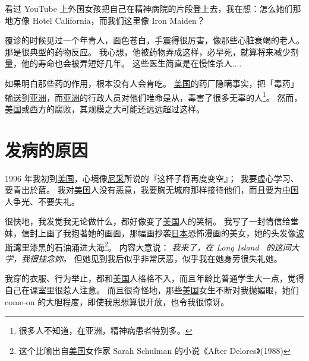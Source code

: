 \documentclass[12pt]{report}
\newcommand{\cc}[2]{#1}
\newcommand{\cc}[2]{#2}
\newcommand{\speechCn}[1]{\textrm{\textit{\textcolor{Speech}{#1}}}}
\begin{document}
{{}

\cc{
看过 YouTube 上外国女孩把自己在精神病院的片段登上去，我在想：怎么她们那地方像 Hotel California，而我们这里像 Iron Maiden？
}{
	
}

\cc{
覆诊的时候见过一个年青人，面色苍白，手震得很厉害，像那些心脏衰竭的老人。 那是很典型的药物反应。 我心想，他被药物弄成这样，必早死，就算将来减少剂量，他的寿命也会被弄短好几年。 这些医生简直是在慢性杀人....
}{
	
}

\cc{
如果明白那些药的作用，根本没有人会肯吃。 \uline{美国}的药厂隐瞒事实，把「毒药」输送到\uline{亚洲}，而\uline{亚洲}的行政人员对他们唯命是从，毒害了很多无辜的人\footnote{很多人不知道，在亚洲，精神病患者特别多。}。 然而，\uline{美国}或西方的腐败，其规模之大可能还远远超过这样。
}{
	
}


\chapter{\cc{发病的原因}{Cause of illness}}
\label{cause-of-illness}

\cc{
1996 年我初到\uline{美国}，心境像\uline{尼采}所说的『这杯子将再度变空』；\ 我要虚心学习、要青出於蓝。 我对\uline{美国}人没有恶意，我要胸无城府那样接待他们，而且要为\uline{中国}人争光、不要失礼。
}{
	
}

\cc{
很快地，我发觉我无论做什么，都好像变了\uline{美国}人的笑柄。 我写了一封情信给堂妹，信封上画了我抱著她的画面，那幅画抄袭\uline{日本}恐怖漫画的美女，她的头发像\uline{波斯湾}里漆黑的石油涌进大海\footnote{这个比喻出自\uline{美国}女作家 Sarah Schulman 的小说《After Delores》(1988)}。 内容大意说： \speechCn{我来了，在 Long Island \ 的这间大学，我很挂念妳。}  但她见到我后似乎非常厌恶，似乎我在她身旁很失礼她。
}{
	
}

\cc{
我穿的衣服、行为举止，都和\uline{美国}人格格不入，而且年龄比普通学生大一点，觉得自己在课室里很惹人注意。 而且很奇怪地，那些\uline{美国}女生不断对我抛媚眼，她们 come-on 的大胆程度，即使我思想算很开放，也令我很惊讶。
}{
	
}}
\end{document}

